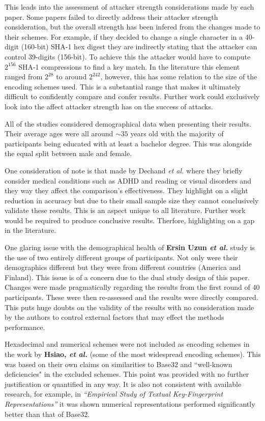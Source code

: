 This leads into the assessment of attacker strength considerations made by each paper. Some papers failed to directly address their attacker strength consideration, but the overall strength has been infered from the changes made to their schemes. For example, if they decided to change a single character in a 40-digit (160-bit) SHA-1 hex digest they are indirectly stating that the attacker can control 39-digits (156-bit). To achieve this the attacker would have to compute $2^{156}$ SHA-1 compressions to find a key match.
In the literature this element ranged from $2^{28}$ to around $2^{242}$, however, this has some relation to the size of the encoding schemes used. This is a substantial range that makes it ultimately difficult to confidently compare and confer results. Further work could exclusively look into the affect attacker strength has on the success of attacks.

All of the studies considered demographical data when presenting their results. Their average ages were all around $\sim35$ years old with the majority of participants being educated with at least a bachelor degree. This was alongside the equal split between male and female.

One consideration of note is that made by Dechand \textit{et al.} \cite{dechand2016empirical} where they briefly consider medical conditions such as ADHD and reading or visual disorders and they way they affect the comparison's effectiveness. They highlight on a slight reduction in accuracy but due to their small sample size they cannot conclusively validate these results. This is an aspect unique to all literature. Further work would be required to produce conclusive results. Therfore, highlighting on a gap in the literature.

One glaring issue with the demographical health of \textbf{Ersin Uzun \textit{et al.}}\cite{uzun2007usability} study is the use of two entirely different groups of participants. Not only were their demographics different but they were from different countries (America and Finland). This issue is of a concern due to the dual study design of this paper. Changes were made pragmatically regarding the results from the first round of 40 participants. These were then re-assessed and the results were directly compared. This puts huge doubts on the validity of the results with no consideration made by the authors to control external factors that may effect the methods performance.

Hexadecimal and numerical schemes were not included as encoding schemes in the work by \textbf{Hsiao, \textit{et al.}}\cite{hsiao2009study} (some of the most widespread encoding schemes). This was based on their own claims on similarities to Base32 and ``well-known deficiencies" in the excluded schemes. This point was provided with no further justification or quantified in any way. It is also not consistent with available research, for example, in \textit{``Empirical Study of Textual Key-Fingerprint Representations''}\cite{dechand2016empirical} it was shown numerical representations performed significantly better than that of Base32.

